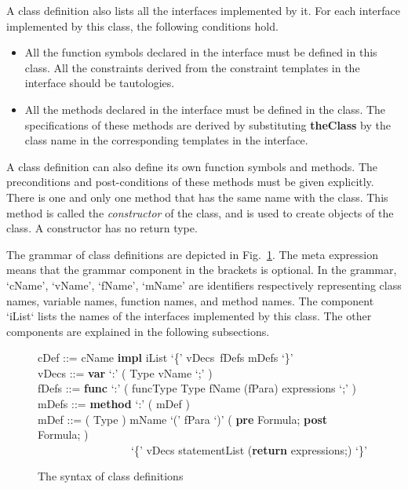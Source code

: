 \documentclass[fleqn]{llncs}
\begin{document}
A class definition also lists all the interfaces implemented by it.
For each interface implemented by this class, the following conditions hold.
\begin{itemize}
\item All the function symbols declared in the interface must be defined in this class.
    All the constraints derived from the constraint templates in the interface should be tautologies.
\item All the methods declared in the interface must be defined in the class. The specifications of these methods are derived by substituting \textbf{theClass} by the class name in the corresponding templates in the interface. \end{itemize}
A class definition can also define its own function symbols and methods. The preconditions and post-conditions of these methods must be given explicitly. There is one and only one method that has the same name with the class. This method is called the \emph{constructor} of the class, and is used to create objects of the class. A constructor has no return type.

The grammar of class definitions are depicted in Fig.~\ref{SYN-CLASS-DEFINITION}. The meta expression  means that the grammar component in the brackets is optional. In the grammar, `cName', `vName', `fName', `mName' are identifiers respectively representing class names, variable names, function names, and method names. The component `iList` lists the names of the interfaces implemented by this class. The other components are explained in the following subsections.

\begin{figure}
\begin{center}
\begin{minipage}{0.9\textwidth}
cDef ::= cName \textbf{impl} iList `\{' vDecs\ fDefs mDefs `\}'\\
vDecs ::= \textbf{var} `:' ( Type vName `;' )\\
fDefs ::=   \textbf{func} `:' ( funcType Type fName (fPara)  expressions `;' )\\
mDefs ::= \textbf{method} `:' ( mDef )\\
mDef  ::= ( Type ) mName `(' fPara `)' ( \textbf{pre} Formula; \textbf{post} Formula; )\\
\mbox{}\ \ \ \ \ \ \ \ \ \ \ \ \ \ \ \ \ `\{' vDecs statementList (\textbf{return} expressions;) `\}'
\end{minipage}
\end{center}
\caption{The syntax of class definitions}\label{SYN-CLASS-DEFINITION}
\end{figure}
\end{document}
